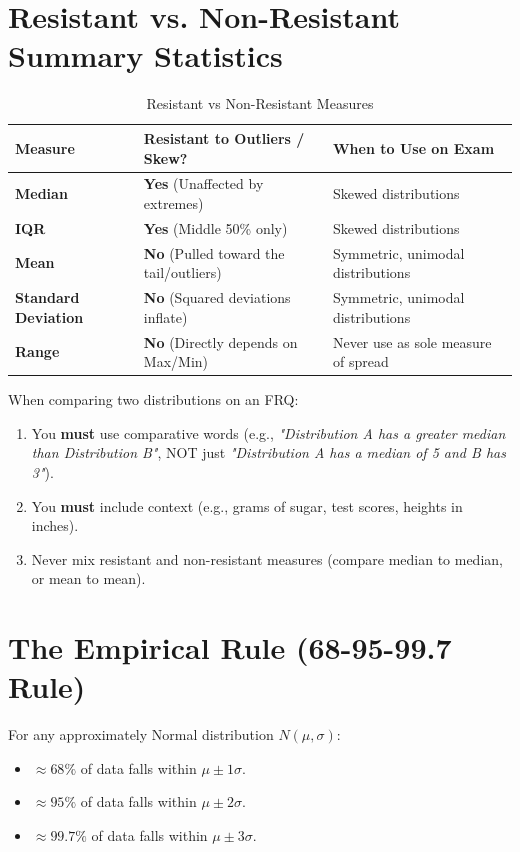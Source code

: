 \section{Resistant vs. Non-Resistant Summary Statistics}

\begin{table}[H]
\centering
\small
\begin{tabular}{@{}lll@{}}
\toprule
\textbf{Measure} & \textbf{Resistant to Outliers / Skew?} & \textbf{When to Use on Exam} \\
\midrule
\textbf{Median} & \textbf{Yes} (Unaffected by extremes) & Skewed distributions \\
\textbf{IQR} & \textbf{Yes} (Middle 50\% only) & Skewed distributions \\
\textbf{Mean} & \textbf{No} (Pulled toward the tail/outliers) & Symmetric, unimodal distributions \\
\textbf{Standard Deviation} & \textbf{No} (Squared deviations inflate) & Symmetric, unimodal distributions \\
\textbf{Range} & \textbf{No} (Directly depends on Max/Min) & Never use as sole measure of spread \\
\bottomrule
\end{tabular}
\caption{Resistant vs Non-Resistant Measures}
\end{table}

\begin{trapbox}
When comparing two distributions on an FRQ:
\begin{enumerate}
    \item You \textbf{must} use comparative words (e.g., \emph{"Distribution A has a greater median than Distribution B"}, NOT just \emph{"Distribution A has a median of 5 and B has 3"}).
    \item You \textbf{must} include context (e.g., grams of sugar, test scores, heights in inches).
    \item Never mix resistant and non-resistant measures (compare median to median, or mean to mean).
\end{enumerate}
\end{trapbox}

\section{The Empirical Rule (68-95-99.7 Rule)}
For any approximately Normal distribution $N(\mu, \sigma)$:
\begin{itemize}
    \item $\approx 68\%$ of data falls within $\mu \pm 1\sigma$.
    \item $\approx 95\%$ of data falls within $\mu \pm 2\sigma$.
    \item $\approx 99.7\%$ of data falls within $\mu \pm 3\sigma$.
\end{itemize}
